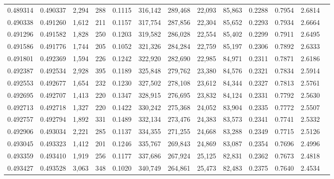 \begin{tabular}{rrrrrrrrrrrrr}
0.489314 & 0.490337 &  2,294 &   288 &                                     0.1115 & 316,142 & 289,468 &  22,093 &  85,863 & 0.2288 & 0.7954 & 2.6814 \\
0.490338 & 0.491260 &  1,612 &   211 &                                     0.1157 & 317,754 & 287,856 &  22,304 &  85,652 & 0.2293 & 0.7934 & 2.6664 \\
0.491296 & 0.491582 &  1,828 &   250 &                                     0.1203 & 319,582 & 286,028 &  22,554 &  85,402 & 0.2299 & 0.7911 & 2.6495 \\
0.491586 & 0.491776 &  1,744 &   205 &                                     0.1052 & 321,326 & 284,284 &  22,759 &  85,197 & 0.2306 & 0.7892 & 2.6333 \\
0.491801 & 0.492369 &  1,594 &   226 &                                     0.1242 & 322,920 & 282,690 &  22,985 &  84,971 & 0.2311 & 0.7871 & 2.6186 \\
0.492387 & 0.492534 &  2,928 &   395 &                                     0.1189 & 325,848 & 279,762 &  23,380 &  84,576 & 0.2321 & 0.7834 & 2.5914 \\
0.492553 & 0.492677 &  1,654 &   232 &                                     0.1230 & 327,502 & 278,108 &  23,612 &  84,344 & 0.2327 & 0.7813 & 2.5761 \\
0.492695 & 0.492707 &  1,413 &   220 &                                     0.1347 & 328,915 & 276,695 &  23,832 &  84,124 & 0.2331 & 0.7792 & 2.5630 \\
0.492713 & 0.492718 &  1,327 &   220 &                                     0.1422 & 330,242 & 275,368 &  24,052 &  83,904 & 0.2335 & 0.7772 & 2.5507 \\
0.492757 & 0.492794 &  1,892 &   331 &                                     0.1489 & 332,134 & 273,476 &  24,383 &  83,573 & 0.2341 & 0.7741 & 2.5332 \\
0.492906 & 0.493034 &  2,221 &   285 &                                     0.1137 & 334,355 & 271,255 &  24,668 &  83,288 & 0.2349 & 0.7715 & 2.5126 \\
0.493045 & 0.493323 &  1,412 &   201 &                                     0.1246 & 335,767 & 269,843 &  24,869 &  83,087 & 0.2354 & 0.7696 & 2.4996 \\
0.493359 & 0.493410 &  1,919 &   256 &                                     0.1177 & 337,686 & 267,924 &  25,125 &  82,831 & 0.2362 & 0.7673 & 2.4818 \\
0.493427 & 0.493528 &  3,063 &   348 &                                     0.1020 & 340,749 & 264,861 &  25,473 &  82,483 & 0.2375 & 0.7640 & 2.4534 \\

\end{tabular}
